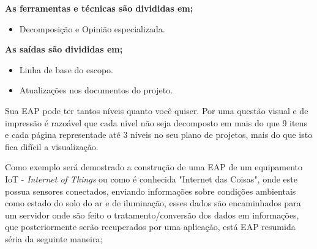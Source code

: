 \documentclass[12pt]{article}
\begin{document}
\textbf{As ferramentas e técnicas são divididas em;}
	\begin{itemize}

		\item
		Decomposição e Opinião especializada.
		
		\end{itemize}


\textbf{As saídas são divididas em;}
	\begin{itemize}

		\item
		Linha de base do escopo.
		
		\item
Atualizações nos documentos do projeto.

	\end{itemize}

Sua EAP pode ter tantos níveis quanto você quiser. Por uma questão visual e de impressão é razoável que cada nível não seja decomposto em mais do que 9 itens e cada página representade até 3 níveis no seu plano de projetos, mais do que isto fica difícil a visualização.

Como exemplo será demostrado a construção de uma EAP de um equipamento IoT - \textit{Internet of Things} ou como é conhecida "Internet das Coisas", onde este possua sensores conectados, enviando informações sobre condições ambientais como estado do solo do ar e de iluminação, esses dados são encaminhados para um servidor onde são feito o tratamento/conversão dos dados em informações, que posteriormente serão recuperados por uma aplicação, está EAP resumida séria da seguinte maneira;
\end{document}
